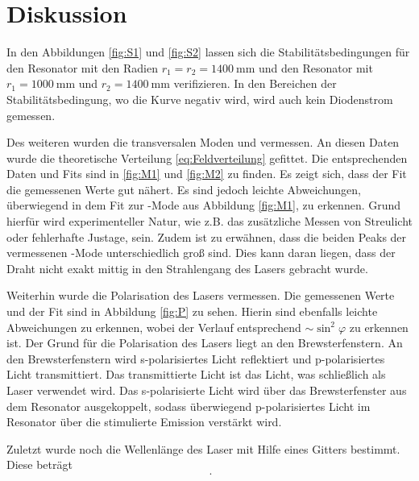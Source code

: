 

\section{Diskussion}

In den Abbildungen \ref{fig:S1} und \ref{fig:S2} lassen sich die
Stabilitätsbedingungen für den Resonator mit den Radien $r_1 = r_2 =
\SI{1400}{\mm}$ und den Resonator mit
$r_1 = \SI{1000}{\mm}$ und $r_2 = \SI{1400}{\mm}$ verifizieren.
In den Bereichen der Stabilitätsbedingung, wo die Kurve negativ wird, wird auch
kein Diodenstrom gemessen.

Des weiteren wurden die transversalen Moden \TEMN und \TEME vermessen.
An diesen Daten wurde die theoretische Verteilung \ref{eq:Feldverteilung}
gefittet.
Die entsprechenden Daten und Fits sind in \ref{fig:M1} und \ref{fig:M2} zu
finden. Es zeigt sich, dass der Fit die gemessenen Werte gut nähert.
Es sind jedoch leichte Abweichungen, überwiegend in dem Fit zur \TEME-Mode aus
Abbildung \ref{fig:M1}, zu erkennen.
Grund hierfür wird experimenteller Natur, wie z.B. das zusätzliche Messen von
Streulicht oder fehlerhafte Justage, sein.
Zudem ist zu erwähnen, dass die beiden Peaks der vermessenen \TEME-Mode
unterschiedlich groß sind.
Dies kann daran liegen, dass der Draht nicht exakt mittig in den Strahlengang
des Lasers gebracht wurde.

Weiterhin wurde die Polarisation des Lasers vermessen.
Die gemessenen Werte und der Fit sind in Abbildung \ref{fig:P} zu sehen.
Hierin sind ebenfalls leichte Abweichungen zu erkennen, wobei der Verlauf
entsprechend $\sim \sin^2\varphi$ zu erkennen ist.
Der Grund für die Polarisation des Lasers liegt an den Brewsterfenstern.
An den Brewsterfenstern wird s-polarisiertes Licht reflektiert und
p-polarisiertes Licht transmittiert.
Das transmittierte Licht ist das Licht, was schließlich als Laser verwendet wird.
Das s-polarisierte Licht wird über das Brewsterfenster aus dem Resonator
ausgekoppelt, sodass überwiegend p-polarisiertes Licht im Resonator
über die stimulierte Emission verstärkt wird.

Zuletzt wurde noch die Wellenlänge des Laser mit Hilfe eines Gitters bestimmt.
Diese beträgt
\begin{equation}
	 ~.
\end{equation}
